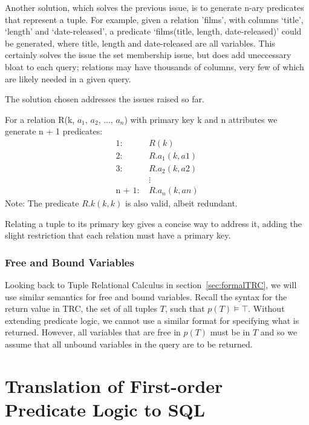 \documentclass[a4paper, 11pt]{article}
\begin{document}
      Another solution, which solves the previous issue, is to generate n-ary
      predicates that represent a tuple. For example, given a relation 'films',
      with columns `title', `length' and `date-released', a predicate
      `films(title, length, date-released)' could be generated, where title,
      length and date-released are all variables. This certainly solves the
      issue the set membership issue, but does add uneccessary bloat to each
      query; relations may have thousands of columns, very few of which are
      likely needed in a given query.

      The solution chosen addresses the issues raised so far.

      For a relation R(k, $a_{1}$, $a_{2}$, ..., $a_{n}$) with primary key k
      and n attributes we generate n + 1 predicates:
      \begin{align*}
        \text{1:  }     & R(k)           \\
        \text{2:  }     & R.a_1(k, a1)   \\
        \text{3:  }     & R.a_2(k, a2)   \\
                        & \vdots         \\
        \text{n + 1:  }  & R.a_n(k, an)
      \end{align*}
      Note: The predicate $R.k(k, k)$ is also valid, albeit redundant.

      Relating a tuple to its primary key gives a concise way to address it,
      adding the slight restriction that each relation must have a primary key.

    \subsubsection{Free and Bound Variables}
    \label{sec:freebound}

      Looking back to Tuple Relational Calculus in section~\ref{sec:formalTRC},
      we will use similar semantics for free and bound variables. Recall the
      syntax for the return value in TRC, the set of all tuples $T$, such that
      $p(T) \models \top$. Without extending predicate logic, we cannot use a
      similar format for specifying what is returned. However, all variables
      that are free in $p(T)$ must be in $T$ and so we assume that all unbound
      variables in the query are to be returned.

  \section{Translation of First-order Predicate Logic to SQL}
\end{document}
